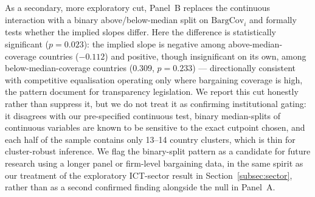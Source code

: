 \documentclass[12pt,a4paper]{article}
\begin{document}
As a secondary, more exploratory cut, Panel~B replaces the continuous
interaction with a binary above/below-median split on $\text{BargCov}_i$ and
formally tests whether the implied slopes differ.  Here the difference is
statistically significant ($p=0.023$): the implied slope is negative among
above-median-coverage countries ($-0.112$) and positive, though
insignificant on its own, among below-median-coverage countries ($0.309$,
$p=0.233$) --- directionally consistent with competitive equalisation
operating only where bargaining coverage is high, the pattern
\citet{VaccaroEtAl2024} document for transparency legislation.  We report
this cut honestly rather than suppress it, but we do not treat it as
confirming institutional gating: it disagrees with our pre-specified
continuous test, binary median-splits of continuous variables are known to
be sensitive to the exact cutpoint chosen, and each half of the sample
contains only 13--14 country clusters, which is thin for cluster-robust
inference.  We flag the binary-split pattern as a candidate for future
research using a longer panel or firm-level bargaining data, in the same
spirit as our treatment of the exploratory ICT-sector result in
Section~\ref{subsec:sector}, rather than as a second confirmed finding
alongside the null in Panel~A.
\end{document}
